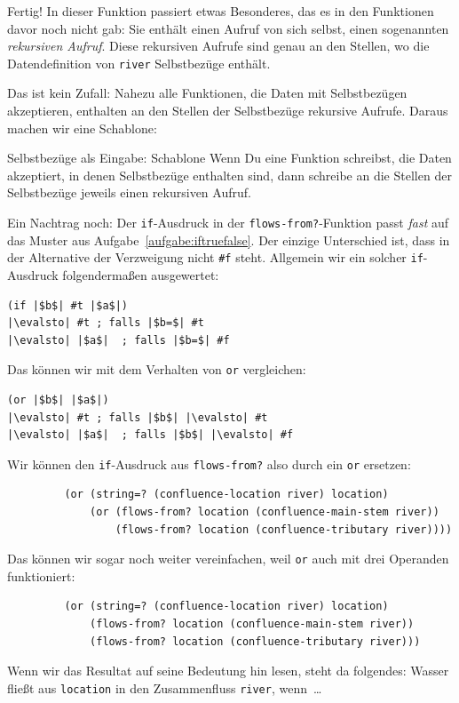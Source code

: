 %
Fertig!
In dieser Funktion passiert etwas Besonderes, das es in den
Funktionen davor noch nicht gab: Sie enthält einen Aufruf von sich
selbst, einen sogenannten \textit{rekursiven Aufruf}.  Diese rekursiven Aufrufe sind genau an den Stellen, wo
die Datendefinition von \lstinline{river} Selbstbezüge enthält.

Das ist kein Zufall: Nahezu alle Funktionen, die Daten mit
Selbstbezügen akzeptieren, enthalten an den Stellen der Selbstbezüge
rekursive Aufrufe.  Daraus machen wir eine Schablone:
%
\begin{konstruktionsanleitung}{Selbstbezüge als Eingabe: Schablone}
  \label{ka:selbstbezug-schablone}
  Wenn Du eine Funktion schreibst, die Daten akzeptiert, in denen
  Selbstbezüge enthalten sind, dann schreibe an die Stellen der
  Selbstbezüge jeweils einen rekursiven Aufruf.
\end{konstruktionsanleitung}
%
Ein Nachtrag noch: Der \lstinline{if}-Ausdruck in der
\lstinline{flows-from?}-Funktion passt \emph{fast} auf das Muster
aus Aufgabe~\ref{aufgabe:iftruefalse}.  Der einzige Unterschied ist,
dass in der Alternative der Verzweigung nicht \lstinline{#f} steht.
Allgemein wir ein solcher \lstinline{if}-Ausdruck folgendermaßen
ausgewertet:
%
\begin{lstlisting}
(if |$b$| #t |$a$|)
|\evalsto| #t ; falls |$b=$| #t
|\evalsto| |$a$|  ; falls |$b=$| #f
\end{lstlisting}
%
Das können wir mit dem Verhalten von \lstinline{or} vergleichen:
%
\begin{lstlisting}
(or |$b$| |$a$|)
|\evalsto| #t ; falls |$b$| |\evalsto| #t
|\evalsto| |$a$|  ; falls |$b$| |\evalsto| #f
\end{lstlisting}
%
Wir können den \lstinline{if}-Ausdruck aus \lstinline{flows-from?}
also durch ein \lstinline{or} ersetzen:
%
\begin{lstlisting}
         (or (string=? (confluence-location river) location)
             (or (flows-from? location (confluence-main-stem river))
                 (flows-from? location (confluence-tributary river))))
\end{lstlisting}
%
Das können wir sogar noch weiter vereinfachen, weil \lstinline{or}
auch mit drei Operanden funktioniert:
%
\begin{lstlisting}
         (or (string=? (confluence-location river) location)
             (flows-from? location (confluence-main-stem river))
             (flows-from? location (confluence-tributary river)))
\end{lstlisting}
%
Wenn wir das Resultat auf seine Bedeutung hin lesen, steht da folgendes: Wasser fließt aus \lstinline{location} in den Zusammenfluss \lstinline{river}, wenn~\ldots

